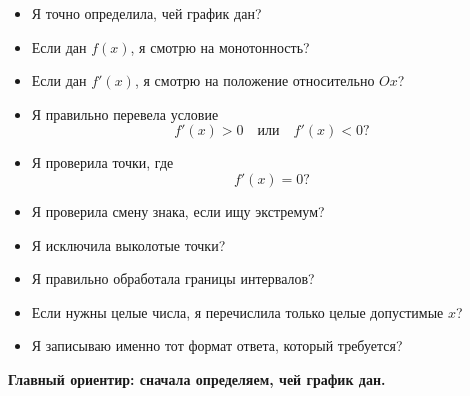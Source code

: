 \documentclass[a4paper,12pt]{article}
\begin{document}
\begin{itemize}
    \item Я точно определила, чей график дан?
    \item Если дан \(f(x)\), я смотрю на монотонность?
    \item Если дан \(f'(x)\), я смотрю на положение относительно \(Ox\)?
    \item Я правильно перевела условие
    \[
    f'(x)>0
    \quad\text{или}\quad
    f'(x)<0?
    \]
    \item Я проверила точки, где
    \[
    f'(x)=0?
    \]
    \item Я проверила смену знака, если ищу экстремум?
    \item Я исключила выколотые точки?
    \item Я правильно обработала границы интервалов?
    \item Если нужны целые числа, я перечислила только целые допустимые \(x\)?
    \item Я записываю именно тот формат ответа, который требуется?
\end{itemize}

\vspace{3mm}

\begin{center}
{\large\bfseries\color{darkaccent}
Главный ориентир:
сначала определяем, чей график дан.
}
\end{center}
\end{document}
